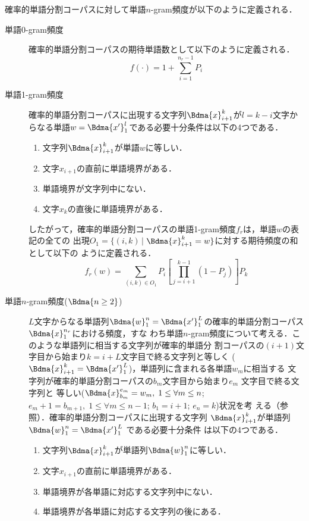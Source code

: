 \documentclass[japanese]{jnlp_1.4}
\begin{document}
確率的単語分割コーパスに対して単語$n$-gram頻度が以下のように定義される．
\begin{description}
\item[単語0-gram頻度] 確率的単語分割コーパスの期待単語数として以下のように定義される．
  \begin{equation}
    \label{equation:0-gram}
    f(\cdot) = 1 + \sum_{i=1}^{n_{r}-1} P_{i}
  \end{equation}
\item[単語1-gram頻度] 確率的単語分割コーパスに出現する文字列$\Bdma{x}_{i+1}^{k}$が$l
  = k-i$文字からなる単語$w = \Bdma{x'}_{1}^{l}$である必要十分条件は以下の4つである．
  \begin{enumerate}
  \item 文字列$\Bdma{x}_{i+1}^{k}$が単語$w$に等しい．
  \item 文字$x_{i+1}$の直前に単語境界がある．
  \item 単語境界が文字列中にない．
  \item 文字$x_{k}$の直後に単語境界がある．
  \end{enumerate}
  したがって，確率的単語分割コーパスの単語1-gram頻度$f_{r}$は，単語$w$の表記の全ての
  出現$O_{1} = \{(i,k)\,|$ $\Bdma{x}_{i+1}^{k} = w\}$に対する期待頻度の和として以下の
  ように定義される．
  \begin{equation}
    \label{eqnarray:1-gram}
    f_{r}(w)
    = \sum_{(i,k) \in O_{1}}P_{i}\left[\prod_{j=i+1}^{k-1}(1-P_{j})\right]P_{k}
  \end{equation}
\item[単語$n$-gram頻度($\Bdma{n\geq2}$)] $L$文字からなる単語列$\Bdma{w}_{1}^{n} =
  \Bdma{x'}_{1}^{L}$の確率的単語分割コーパス$\Bdma{x}_{1}^{n_{r}}$における頻度，すな
  わち単語$n$-gram頻度について考える．このような単語列に相当する文字列が確率的単語分
  割コーパスの$(i+1)$文字目から始まり$k = i+L$文字目で終る文字列と等しく
  ($\Bdma{x}_{i+1}^{k} = \Bdma{x'}_{1}^{L}$)，単語列に含まれる各単語$w_{m}$に相当する
  文字列が確率的単語分割コーパスの$b_{m}$文字目から始まり$e_{m}$ 文字目で終る文字列と
  等しい($\Bdma{x} _{b_{m}}^{e_{m}} = w_{m},\; 1 \leq \forall m \leq n$;
  $e_{m}+1=b_{m+1},\; 1 \leq \forall m \leq n-1$; $b_{1} = i+1$; $e_{n} = k$)状況を考
  える（参照）．確率的単語分割コーパスに出現する文字列
  $\Bdma{x}_{i+1}^{k}$が単語列$\Bdma{w}_{1}^{n}=\Bdma{x'}_{1}^{L}$ である必要十分条件
  は以下の4つである．
  \begin{enumerate}
  \item 文字列$\Bdma{x}_{i+1}^{k}$が単語列$\Bdma{w}_{1}^{n}$に等しい．
  \item 文字$x_{i+1}$の直前に単語境界がある．
  \item 単語境界が各単語に対応する文字列中にない．
  \item 単語境界が各単語に対応する文字列の後にある．
  \end{enumerate}


\end{description}
\end{document}
